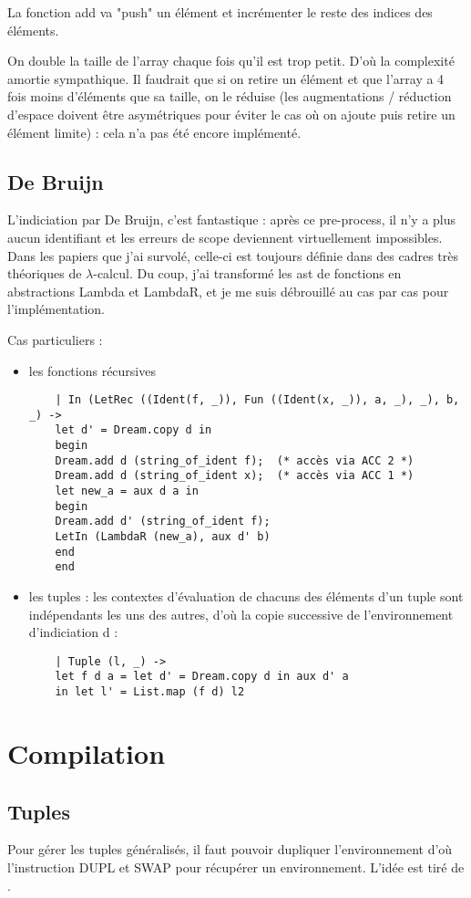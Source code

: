\documentclass[paper=a4, fontsize=11pt, twocolumn]{article}
\begin{document}
La fonction add va "push" un élément et incrémenter le reste des indices des éléments.

On double la taille de l'array chaque fois qu'il est trop petit. D'où la complexité amortie sympathique.
Il faudrait que si on retire un élément et que l'array a 4 fois moins d'éléments que sa taille, on le réduise (les augmentations / réduction d'espace doivent être asymétriques pour éviter le cas où on ajoute puis retire un élément limite) : cela n'a pas été encore implémenté.

\subsection{De Bruijn}
L'indiciation par De Bruijn, c'est fantastique : après ce pre-process, il n'y a plus aucun identifiant et les erreurs de scope deviennent virtuellement impossibles.
Dans les papiers que j'ai survolé, celle-ci est toujours définie dans des cadres très théoriques de $\lambda$-calcul. Du coup, j'ai transformé les ast de fonctions en abstractions Lambda et LambdaR, et je me suis débrouillé au cas par cas pour l'implémentation.

Cas particuliers :
\begin{itemize}
	\item les fonctions récursives
	\begin{verbatim}
	| In (LetRec ((Ident(f, _)), Fun ((Ident(x, _)), a, _), _), b, _) ->
	let d' = Dream.copy d in
	begin
	Dream.add d (string_of_ident f);  (* accès via ACC 2 *)
	Dream.add d (string_of_ident x);  (* accès via ACC 1 *)
	let new_a = aux d a in
	begin
	Dream.add d' (string_of_ident f);
	LetIn (LambdaR (new_a), aux d' b)
	end
	end
	\end{verbatim}
	\item les tuples : les contextes d'évaluation de chacuns des éléments d'un tuple sont indépendants les uns des autres, d'où la copie successive de l'environnement d'indiciation d : 
	\begin{verbatim}
	| Tuple (l, _) ->
	let f d a = let d' = Dream.copy d in aux d' a
	in let l' = List.map (f d) l2
	\end{verbatim}
\end{itemize}

\section{Compilation}
\subsection{Tuples}
Pour gérer les tuples généralisés, il faut pouvoir dupliquer l'environnement d'où l'instruction DUPL et SWAP pour récupérer un environnement.
L'idée est tiré de \cite{cousineau}.
\end{document}
